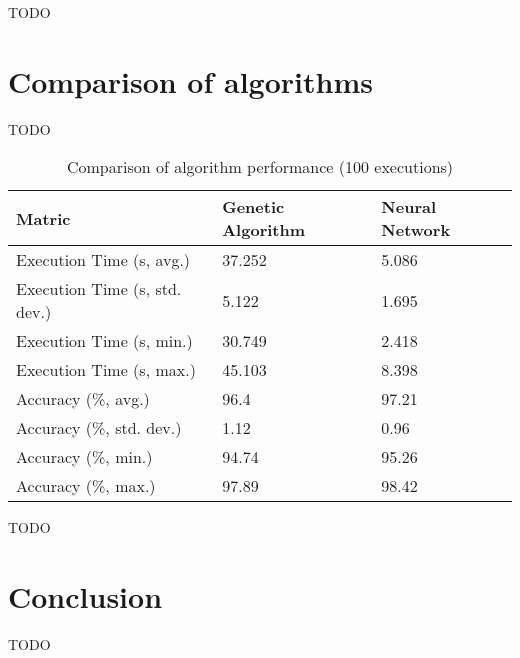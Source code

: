 \documentclass[a4paper]{article}
\begin{document}
TODO

\section{Comparison of algorithms}

TODO

\begin{table}[h!]
  \centering
  \begin{tabular}{@{}lll@{}}
    \toprule
    Matric                        & Genetic Algorithm & Neural Network \\
    \midrule
    Execution Time (s, avg.)      & 37.252            & 5.086          \\
    Execution Time (s, std. dev.) & 5.122             & 1.695          \\
    Execution Time (s, min.)      & 30.749            & 2.418          \\
    Execution Time (s, max.)      & 45.103            & 8.398          \\
    Accuracy (\%, avg.)           & 96.4              & 97.21          \\
    Accuracy (\%, std. dev.)      & 1.12              & 0.96           \\
    Accuracy (\%, min.)           & 94.74             & 95.26          \\
    Accuracy (\%, max.)           & 97.89             & 98.42          \\
    \bottomrule
  \end{tabular}
  \caption{Comparison of algorithm performance (100 executions)}
  \label{tab:comparison_avg}
\end{table}

TODO

\section{Conclusion}

TODO

\end{document}
